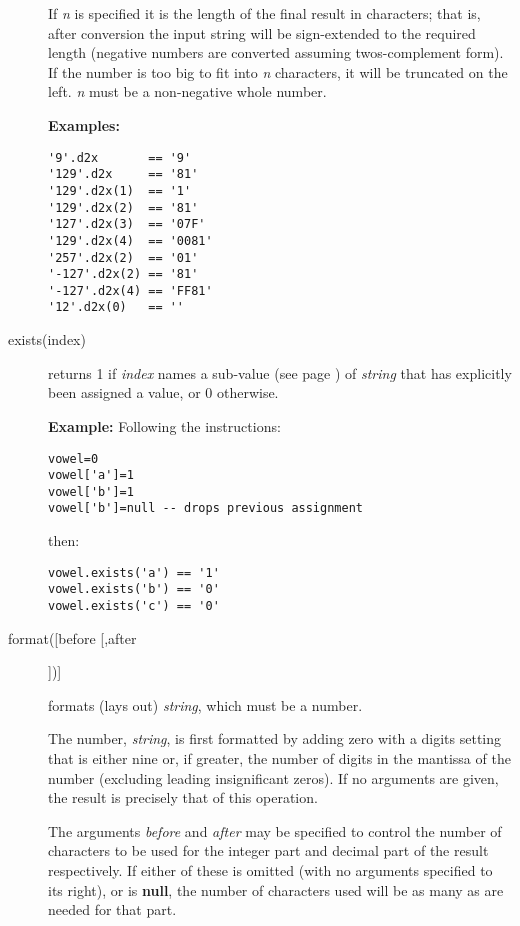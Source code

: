 \begin{description}
If \emph{n} is specified it is the length of the final result in
characters; that is, after conversion the input string will be
sign-extended to the required length (negative numbers are converted
assuming twos-complement form).
If the number is too big to fit into \emph{n} characters, it will be
truncated on the left.
\emph{n} must be a non-negative whole number.
 
\textbf{Examples:}
\begin{lstlisting}
'9'.d2x       == '9'
'129'.d2x     == '81'
'129'.d2x(1)  == '1'
'129'.d2x(2)  == '81'
'127'.d2x(3)  == '07F'
'129'.d2x(4)  == '0081'
'257'.d2x(2)  == '01'
'-127'.d2x(2) == '81'
'-127'.d2x(4) == 'FF81'
'12'.d2x(0)   == ''
\end{lstlisting}
\item[exists(index)]\label{refexists}

returns 1 if \emph{index} names a  sub-value (see page \pageref{refinstr})  of
\emph{string} that has explicitly been assigned a value, or 0
otherwise.
 
\textbf{Example:}
 Following the instructions:
\begin{lstlisting}
vowel=0
vowel['a']=1
vowel['b']=1
vowel['b']=null -- drops previous assignment
\end{lstlisting}
then:
\begin{lstlisting}
vowel.exists('a') == '1'
vowel.exists('b') == '0'
vowel.exists('c') == '0'
\end{lstlisting}
\item[format([before [,after]])]\label{refformat}

formats (lays out) \emph{string}, which must be a number.
 
The number, \emph{string}, is first formatted by adding zero with a
digits setting that is either nine or, if greater, the number of digits
in the mantissa of the number (excluding leading insignificant zeros).
If no arguments are given, the result is precisely that of this
operation.
 
The arguments \emph{before} and \emph{after} may be specified to
control the number of characters to be used for the integer part and
decimal part of the result respectively.  If either of these is omitted
(with no arguments specified to its right), or is \textbf{null}, the
number of characters used will be as many as are needed for that part.
 

\end{description}
